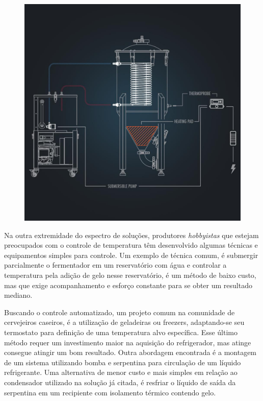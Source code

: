 \begin{figure}[H]
    \centering
    \includegraphics[scale=0.25]{figuras/contexto/glycol_ftss2_1000x.jpg}
    \label{fig:ssbrewtech}
\end{figure}


Na outra extremidade do espectro de soluções, produtores \textit{hobbyistas} que estejam preocupados com o controle de temperatura têm desenvolvido algumas técnicas e equipamentos simples para controle. Um exemplo de técnica comum, é submergir parcialmente o fermentador em um reservatório com água e controlar a temperatura pela adição de gelo nesse reservatório, é um método de baixo custo, mas que exige acompanhamento e esforço constante para se obter um resultado mediano. 


Buscando o controle automatizado, um projeto comum na comunidade de cervejeiros caseiros, é a utilização de geladeiras ou freezers, adaptando-se seu termostato para definição de uma temperatura alvo específica. Esse último método requer um investimento maior na aquisição do refrigerador, mas atinge consegue atingir um bom resultado.
Outra abordagem encontrada é a montagem de um sistema utilizando bomba e serpentina para circulação de um líquido refrigerante. Uma alternativa de menor custo e mais simples em relação ao condensador utilizado na solução já citada, é resfriar o líquido de saída da serpentina em um recipiente com isolamento térmico contendo gelo.


